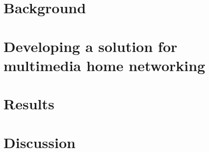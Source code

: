 \documentclass[english,12pt,a4paper,pdftex]{article}
\begin{document}
 

\clearpage

 \section{Background}
 


\clearpage

\section{Developing a solution for multimedia home networking}



\clearpage

\section{Results}



\clearpage

\section{Discussion}



\clearpage



\cite{stateofHN}
\cite{airplay-spec}
\cite{next_generation}
\cite{DLNA_proxy2}
\cite{upnp}
\cite{standards-perspective}
\cite{DLNA_proxy}
\cite{end_user}



 

%
\end{document}
